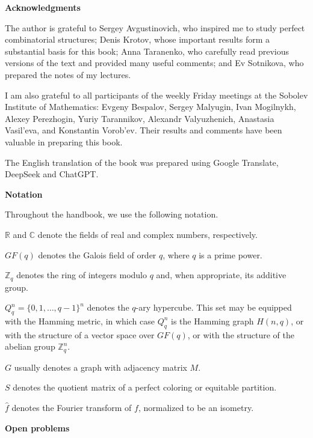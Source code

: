 \documentclass[11pt]{article}
\theoremstyle{definition}
\begin{document}
\smallskip

{\bf Acknowledgments}

The author is grateful to Sergey Avgustinovich, who inspired me to
study perfect combinatorial structures; Denis Krotov, whose important
results form a substantial basis for this book; Anna Taranenko, who
carefully read previous versions of the text and provided many useful
comments; and Ev Sotnikova, who prepared the notes of my lectures.

I am also grateful to all participants of the weekly Friday meetings
at the Sobolev Institute of Mathematics: Evgeny Bespalov, Sergey
Malyugin, Ivan Mogilnykh, Alexey Perezhogin, Yuriy Tarannikov,  Alexandr Valyuzhenich, Anastasia
Vasil'eva, and Konstantin Vorob'ev. Their results
and comments have been valuable in preparing this book.

The English translation of the book was prepared using Google Translate, DeepSeek and ChatGPT.



\pagebreak

{\bf Notation}

Throughout the handbook, we use the following notation.

$\mathbb{R}$ and $\mathbb{C}$ denote the fields of real and complex
numbers, respectively.

$GF(q)$ denotes the Galois field of order $q$, where $q$ is a prime
power.

$\mathbb{Z}_q$ denotes the ring of integers modulo $q$ and, when
appropriate, its additive group.

$Q_q^n=\{0,1,\dots,q-1\}^n$ denotes the $q$-ary hypercube. This set may
be equipped with the Hamming metric, in which case $Q_q^n$ is the
Hamming graph $H(n,q)$, or with the structure of a vector space over
$GF(q)$, or with the structure of the abelian group $\mathbb{Z}_q^n$.

$G$ usually denotes a graph with adjacency matrix $M$.

$S$ denotes the quotient matrix of a perfect coloring or equitable
partition.

$\widehat{f}$ denotes the Fourier transform of $f$, normalized to be an
isometry.

\smallskip
 
{\bf Open problems}
\end{document}
